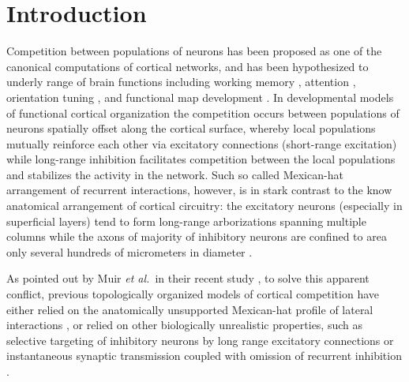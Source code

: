 \documentclass[utf8]{frontiersSCNS}
\newcommand{\etal}{\textit{et al.}}
\begin{document}


\section{Introduction}

Competition between populations of neurons has been proposed as one of the canonical computations of cortical 
networks, and has been hypothesized to underly range of brain functions including working memory \citep{Amit1995,Durstewitz2000,Deco2003},
attention \citep{Deco2003}, orientation tuning \citep{Somers1995,Ben-Yishai1995,Antolik2011}, and functional map development \citep{VonderMalsburg1973,CMVC,Antolik2011}. In developmental models of functional cortical organization the competition occurs between populations of neurons spatially offset 
along the cortical surface, whereby local populations mutually reinforce each other via excitatory connections (short-range 
excitation) while long-range inhibition facilitates competition between the local populations and stabilizes the activity in the 
network. Such so called Mexican-hat arrangement of recurrent interactions, however, is in stark contrast to the know anatomical arrangement
of cortical circuitry: the excitatory neurons (especially in superficial layers) tend to form long-range arborizations spanning 
multiple columns while the axons of majority of inhibitory neurons are confined to area only several hundreds of micrometers 
in diameter \citep{Buzas2006,Budd2001}. 


As pointed out by Muir \etal\, in their recent study \citep{Muir2014}, to solve this apparent conflict, previous topologically organized models of cortical competition have either relied on the anatomically unsupported Mexican-hat profile of lateral interactions \citep{VonderMalsburg1973,CMVC}, or relied on other biologically unrealistic properties, such as selective targeting of inhibitory neurons by long range excitatory connections \citep{law:phd09,Rutishauser2012} or instantaneous synaptic transmission coupled with omission of recurrent inhibition \citep{Kang2003,Levy2011,Grabska-Barwinska2008}. 
\end{document}
